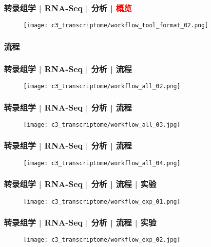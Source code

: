 \begin{frame}
  \frametitle{转录组学 | RNA-Seq | 分析 | \textcolor{red}{概览}}
  \begin{figure}
    \centering
    \texttt{[image: c3\_transcriptome/workflow\_tool\_format\_02.png]}
  \end{figure}
\end{frame}

\subsubsection{流程}
\begin{frame}
  \frametitle{转录组学 | RNA-Seq | 分析 | 流程}
  \begin{figure}
    \centering
    \texttt{[image: c3\_transcriptome/workflow\_all\_02.png]}
  \end{figure}
\end{frame}

\begin{frame}
  \frametitle{转录组学 | RNA-Seq | 分析 | 流程}
  \begin{figure}
    \centering
    \texttt{[image: c3\_transcriptome/workflow\_all\_03.jpg]}
  \end{figure}
\end{frame}

\begin{frame}
  \frametitle{转录组学 | RNA-Seq | 分析 | 流程}
  \begin{figure}
    \centering
    \texttt{[image: c3\_transcriptome/workflow\_all\_04.png]}
  \end{figure}
\end{frame}

\begin{frame}
  \frametitle{转录组学 | RNA-Seq | 分析 | 流程 | 实验}
  \begin{figure}
    \centering
    \texttt{[image: c3\_transcriptome/workflow\_exp\_01.png]}
  \end{figure}
\end{frame}

\begin{frame}
  \frametitle{转录组学 | RNA-Seq | 分析 | 流程 | 实验}
  \begin{figure}
    \centering
    \texttt{[image: c3\_transcriptome/workflow\_exp\_02.jpg]}
  \end{figure}
\end{frame}

